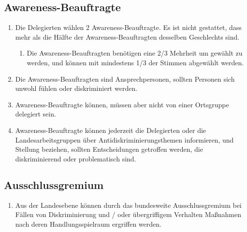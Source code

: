 \documentclass[a4paper,
  ]{scrartcl}
\begin{document}
\subsection{Awareness-Beauftragte}
\begin{enumerate}
      \item Die Delegierten wählen 2 Awareness-Beauftragte. Es ist nicht gestattet, dass mehr als die Hälfte
            der Awareness-Beauftragten desselben Geschlechts sind.
            \begin{enumerate}
                  \item Die Awareness-Beauftragten benötigen eine 2/3 Mehrheit um gewählt zu werden, und
                        können mit mindestens 1/3 der Stimmen abgewählt werden.
            \end{enumerate}
      \item Die Awareness-Beauftragten sind Ansprechpersonen, sollten Personen sich unwohl fühlen oder
            diskriminiert werden.
      \item Awareness-Beauftragte können, müssen aber nicht von einer Ortsgruppe delegiert sein.
      \item Awareness-Beauftragte können jederzeit die Delegierten oder die Landesarbeitsgruppen über
            Antidiskriminierungsthemen informieren, und Stellung beziehen, sollten Entscheidungen getroffen
            werden, die diskriminierend oder problematisch sind.
\end{enumerate}
\subsection{Ausschlussgremium}
\begin{enumerate}
      \item Aus der Landesebene können durch das bundesweite Ausschlussgremium bei Fällen von
            Diskriminierung und / oder übergriffigem Verhalten Maßnahmen nach deren Handlungsspielraum
            ergriffen werden.
\end{enumerate}
\end{document}
